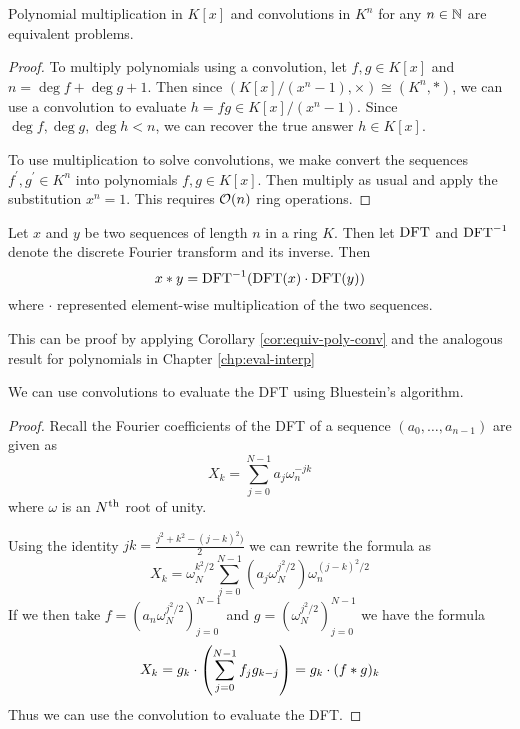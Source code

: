 \begin{corollary}\label{cor:equiv-poly-conv}
    Polynomial multiplication in $K[x]$ and convolutions in $K^n$ for any $n \in {\mathbb N}$ are equivalent problems.
\end{corollary}

\begin{proof}
    To multiply polynomials using a convolution, let $f, g \in K[x]$ and $n = \deg f + \deg g + 1$. Then since $(K[x]/(x^n - 1), \times) \cong (K^n, \ast)$, we can use a convolution to evaluate $h = fg \in K[x]/(x^n -1)$. Since $\deg f, \deg g, \deg h < n$, we can recover the true answer $h \in K[x]$.

    To use multiplication to solve convolutions, we make convert the sequences $f^\prime, g^\prime \in K^n$ into polynomials $f, g \in K[x]$. Then multiply as usual and apply the substitution $x^n = 1$. This requires $\mathcal O(n)$ ring operations.
\end{proof}

\begin{definition}\label{def:convolution-property}
    Let $x$ and $y$ be two sequences of length $n$ in a ring $K$. Then let $\textrm{DFT}$ and $\textrm{DFT}^{-1}$ denote the discrete Fourier transform and its inverse. Then
    \[
        x \ast y = \textrm{DFT}^{-1}(\textrm{DFT}(x) \cdot \textrm{DFT}(y))
    \]
    where $\cdot$ represented element-wise multiplication of the two sequences.
\end{definition}

This can be proof by applying Corollary \ref{cor:equiv-poly-conv} and the analogous result for polynomials in Chapter \ref{chp:eval-interp}


\begin{proposition}
    We can use convolutions to evaluate the DFT using Bluestein's algorithm.
\end{proposition}

\begin{proof}
    Recall the Fourier coefficients of the DFT of a sequence $(a_0, \ldots, a_{n-1})$ are given as
    \[
        X_k = \sum^{N-1}_{j=0} a_j\omega_n^{-jk}
    \]
    where $\omega$ is an $N^{\textrm{th}}$ root of unity.
    
    Using the identity $jk = \frac{j^2 + k^2 - (j - k)^2)}{2}$ we can rewrite the formula as
    \[
        X_k = \omega_N^{k^2/2} \sum^{N-1}_{j=0} (a_j \omega_N^{j^2/2}) \omega_n^{(j - k)^2/2}
    \]
    If we then take $f = (a_n \omega_N^{j^2/2})_{j=0}^{N-1}$ and $g = (\omega_N^{j^2/2})_{j=0}^{N-1}$ we have the formula
    \[
        X_k = g_k \cdot \left(\sum^{N-1}_{j=0} f_j g_{k-j}\right) = g_k \cdot (f \ast g)_k
    \]
    Thus we can use the convolution to evaluate the DFT.
\end{proof}


